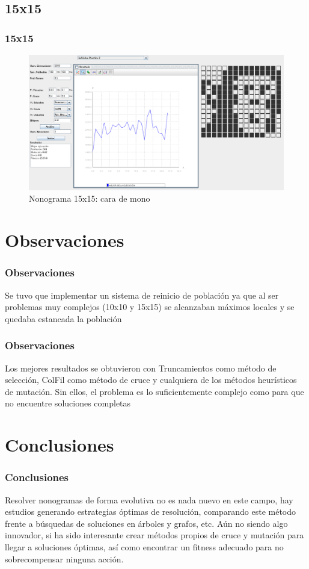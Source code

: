\documentclass{beamer}
\begin{document}
\subsection{15x15}
\begin{frame}
    \frametitle{15x15}
    \begin{figure}
        \includegraphics[width=\textwidth]{Images/15x15.png}
        \caption{Nonograma 15x15: cara de mono}
    \end{figure}
\end{frame}

\section{Observaciones}
\begin{frame}
    \frametitle{Observaciones}
    Se tuvo que implementar un sistema de reinicio de población ya que al ser problemas muy complejos (10x10 y 15x15) se alcanzaban máximos locales y se quedaba estancada la población
\end{frame}
\begin{frame}
    \frametitle{Observaciones}
    Los mejores resultados se obtuvieron con Truncamientos como método de selección, ColFil como método de cruce y cualquiera de los métodos heurísticos de mutación. Sin ellos, el problema es lo suficientemente complejo como para que no encuentre soluciones completas
\end{frame}

\section{Conclusiones}
\begin{frame}
    \frametitle{Conclusiones}
    Resolver nonogramas de forma evolutiva no es nada nuevo en este campo, hay estudios generando estrategias óptimas de resolución, comparando este método frente a búsquedas de soluciones en árboles y grafos, etc.
    Aún no siendo algo innovador, si ha sido interesante crear métodos propios de cruce y mutación para llegar a soluciones óptimas, así como encontrar un fitness adecuado para no sobrecompensar ninguna acción.
\end{frame}
\end{document}
